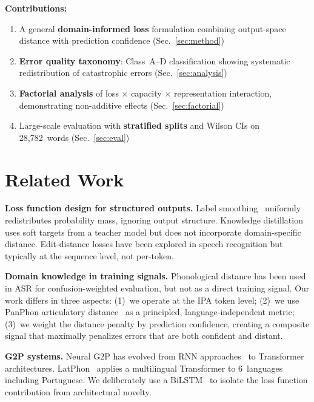 \documentclass[conference]{IEEEtran}
\begin{document}
\textbf{Contributions:}
\begin{enumerate}
  \item A general \textbf{domain-informed loss} formulation
        combining output-space distance with prediction
        confidence (Sec.~\ref{sec:method})
  \item \textbf{Error quality taxonomy}: Class~A--D classification
        showing systematic redistribution of catastrophic errors
        (Sec.~\ref{sec:analysis})
  \item \textbf{Factorial analysis} of loss $\times$ capacity
        $\times$ representation interaction, demonstrating
        non-additive effects (Sec.~\ref{sec:factorial})
  \item Large-scale evaluation with \textbf{stratified splits} and
        Wilson CIs on 28{,}782~words (Sec.~\ref{sec:eval})
\end{enumerate}

\section{Related Work}
\label{sec:related}

\textbf{Loss function design for structured outputs.}
Label smoothing~\cite{szegedy2016rethinking} uniformly
redistributes probability mass, ignoring output structure.
Knowledge distillation uses soft targets from a teacher model but
does not incorporate domain-specific distance.
Edit-distance losses have been explored in speech recognition but
typically at the sequence level, not per-token.

\textbf{Domain knowledge in training signals.}
Phonological distance has been used in ASR for confusion-weighted
evaluation, but not as a direct training signal.
Our work differs in three aspects: (1)~we operate at the IPA token
level; (2)~we use PanPhon articulatory
distance~\cite{mortensen2016panphon} as a principled,
language-independent metric; (3)~we weight the distance penalty by
prediction confidence, creating a composite signal that maximally
penalizes errors that are both confident and distant.

\textbf{G2P systems.}
Neural G2P has evolved from RNN
approaches~\cite{rao2015g2p,bisani2008joint} to Transformer
architectures.
LatPhon~\cite{chary2025latphon} applies a multilingual Transformer
to 6~languages including Portuguese.
We deliberately use a BiLSTM~\cite{bahdanau2014neural} to isolate
the loss function contribution from architectural novelty.
\end{document}
